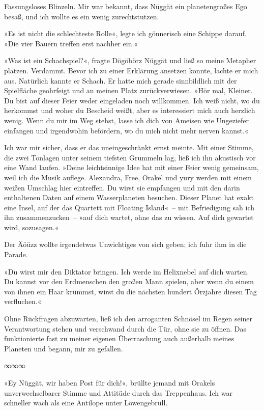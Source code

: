 Fassungsloses Blinzeln. Mir war bekannt, dass Nüggät ein planetengroßes Ego besaß, und ich wollte es ein wenig zurechtstutzen.

»Es ist nicht die schlechteste Rolle«, legte ich gönnerisch eine Schippe darauf. »Die vier Bauern treffen erst nachher ein.«

»Was ist ein Schachspiel?«, fragte Dögöbörz Nüggät und ließ so meine Metapher platzen. Verdammt. Bevor ich zu einer Erklärung ansetzen konnte, lachte er mich aus. Natürlich kannte er Schach. Er hatte mich gerade sinnbildlich mit der Spielfläche geohrfeigt und an meinen Platz zurückverwiesen. »Hör mal, Kleiner. Du bist auf dieser Feier weder eingeladen noch willkommen. Ich weiß nicht, wo du herkommst und woher du Bescheid weißt, aber es interessiert mich auch herzlich wenig. Wenn du mir im Weg stehst, lasse ich dich von Ameisen wie Ungeziefer einfangen und irgendwohin befördern, wo du mich nicht mehr nerven kannst.«

Ich war mir sicher, dass er das uneingeschränkt ernst meinte. Mit einer Stimme, die zwei Tonlagen unter seinem tiefsten Grummeln lag, ließ ich ihn akustisch vor eine Wand laufen. »Deine leichtsinnige Idee hat mit einer Feier wenig gemeinsam, weil ich die Musik auflege. Alexandra, Free, Orakel und yury werden mit einem weißen Umschlag hier eintreffen. Du wirst sie empfangen und mit den darin enthaltenen Daten auf einem Wasserplaneten besuchen. Dieser Planet hat exakt eine Insel, auf der das Quartett mit Floating Island«~– mit Befriedigung sah ich ihn zusammenzucken~– »auf dich wartet, ohne das zu wissen. Auf dich gewartet wird, sozusagen.«

Der Äöüzz wollte irgendetwas Unwichtiges von sich geben; ich fuhr ihm in die Parade.

»Du wirst mir den Diktator bringen. Ich werde im Helixnebel auf dich warten. Du kannst vor den Erdmenschen den großen Mann spielen, aber wenn du einem von ihnen ein Haar krümmst, wirst du die nächsten hundert Örzjahre diesen Tag verfluchen.«

Ohne Rückfragen abzuwarten, ließ ich den arroganten Schnösel im Regen seiner Verantwortung stehen und verschwand durch die Tür, ohne sie zu öffnen. Das funktionierte fast zu meiner eigenen Überraschung auch außerhalb meines Planeten und begann, mir zu gefallen.

\begin{center}
∞∞∞
\end{center}

»Ey Nüggät, wir haben Post für dich!«, brüllte jemand mit Orakels unverwechselbarer Stimme und Attitüde durch das Treppenhaus. Ich war schneller wach als eine Antilope unter Löwengebrüll.

